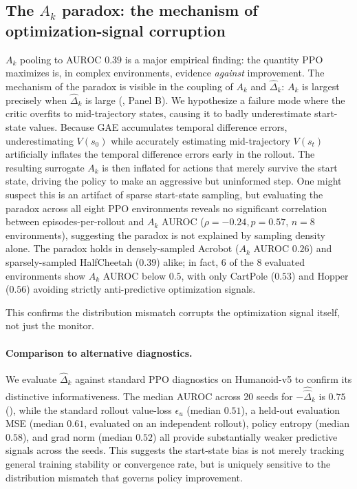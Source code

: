 \documentclass{article}
\begin{document}
\subsection{The $A_k$ paradox: the mechanism of optimization-signal corruption}
$A_k$ pooling to AUROC $0.39$ is a major empirical finding: the quantity PPO maximizes is, in complex environments, evidence \emph{against} improvement. The mechanism of the paradox is visible in the coupling of $A_k$ and $\hat\Delta_k$: $A_k$ is largest precisely when $\hat\Delta_k$ is large (, Panel B). We hypothesize a failure mode where the critic overfits to mid-trajectory states, causing it to badly underestimate start-state values. Because GAE accumulates temporal difference errors, underestimating $V(s_0)$ while accurately estimating mid-trajectory $V(s_t)$ artificially inflates the temporal difference errors early in the rollout. The resulting surrogate $A_k$ is then inflated for actions that merely survive the start state, driving the policy to make an aggressive but uninformed step. One might suspect this is an artifact of sparse start-state sampling, but evaluating the paradox across all eight PPO environments reveals no significant correlation between episodes-per-rollout and $A_k$ AUROC ($\rho = -0.24, p = 0.57$, $n=8$ environments), suggesting the paradox is not explained by sampling density alone. The paradox holds in densely-sampled Acrobot ($A_k$ AUROC $0.26$) and sparsely-sampled HalfCheetah ($0.39$) alike; in fact, 6 of the 8 evaluated environments show $A_k$ AUROC below $0.5$, with only CartPole ($0.53$) and Hopper ($0.56$) avoiding strictly anti-predictive optimization signals. 

This confirms the distribution mismatch corrupts the optimization signal itself, not just the monitor.

\paragraph{Comparison to alternative diagnostics.}
We evaluate $\hat\Delta_k$ against standard PPO diagnostics on Humanoid-v5 to confirm its distinctive informativeness. The median AUROC across 20 seeds for $-\widehat{\hat\Delta}_k$ is $0.75$ (), while the standard rollout value-loss $\epsilon_u$ (median $0.51$), a held-out evaluation MSE (median $0.61$, evaluated on an independent rollout), policy entropy (median $0.58$), and grad norm (median $0.52$) all provide substantially weaker predictive signals across the seeds. This suggests the start-state bias is not merely tracking general training stability or convergence rate, but is uniquely sensitive to the distribution mismatch that governs policy improvement.
\end{document}
